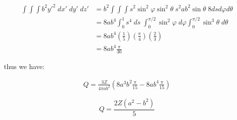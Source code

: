 \documentclass[11pt]{article}
\theoremstyle{definition}
\begin{document}
\begin{align*}
    \int\int\int b^2y'^2 \; dx'\; dy'\; dz' &= b^2 \int\int\int s^2\sin^2\varphi \sin^2\theta \; s^2 ab^2 \sin\theta \; 8ds d\varphi d\theta\\
    &= 8ab^4 \int_{0}^{1}s^4\; ds \;  \int_{0}^{\pi/2} \sin^2\varphi \; d\varphi \int_{0}^{\pi/2} \sin^3\theta \; d\theta\\
    &= 8ab^4 \left(\frac{1}{5}\right) \left(\frac{\pi}{4}\right) \left(\frac{2}{3}\right)\\
    &= 8ab^4 \frac{\pi}{30}
\end{align*}

thus we have:

\begin{align*}
    Q = \frac{3Z}{4\pi ab^2} \left(8a^3 b^2\frac{\pi}{15} - 8ab^4 \frac{\pi}{15} \right)
\end{align*}

\begin{equation}
\boxed{
    Q = \frac{2Z(a^2-b^2)}{5}
}
\end{equation}
\end{document}
